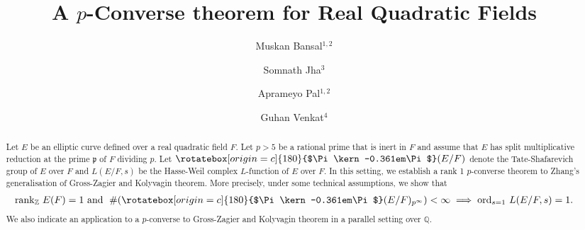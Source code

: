 \documentclass[reqno,10pt]{amsart}
\title{A $p$-Converse theorem for Real Quadratic Fields}
\newcommand{\q}{\mathbb{Q}}
\newcommand{\z}{\mathbb{Z}}
\newcommand{\p}{\mathfrak{p}}
\newcommand{\Varpi}{\rotatebox[origin=c]{180}{$\Pi\kern-0.361em\Pi$}}
\theoremstyle{plain}
\theoremstyle{definition}
\begin{document}
\author{Muskan Bansal$^{1,2}$} 
  \address{$^1$ Harish-Chandra Research Institute, Chhatnag Road, Jhunsi, Prayagraj - 211019, India}
  \address{$^2$Homi Bhabha National Institute, Training School Complex, Anushakti Nagar, Mumbai 400094, India}
\email{}


    \author{Somnath Jha$^3$} 
    \address{$^3$ Depratment of Mathematics, Indian Institute of Technology Kanpur,  Kanpur - 208016, India}
	\email{}
    
\author{Aprameyo Pal$^{1,2}$} 
   
	\email{}
    
    
    
    \author{Guhan Venkat$^4$} 
    \address{$^4$ Department of Mathematics, Ashoka University, Rajiv Gandhi Education City, Haryana - 131029,
    India.}


\begin{abstract}
    Let $E$ be an elliptic curve defined over a real quadratic field $F$. Let $p > 5$ be a rational prime that is inert in $F$ and assume that $E$ has split multiplicative reduction at the prime $\p$ of $F$ dividing $p$. Let $\Varpi(E/F)$ denote the Tate-Shafarevich group of $E$ over $F$ and $ L(E/F,s) $ be the Hasse-Weil complex $L$-function of $E$ over $F$. In this setting, we establish a rank 1 $p$-converse theorem to Zhang's generalisation of Gross-Zagier and Kolyvagin theorem. More precisely, under some technical assumptions, we show that 
    \begin{align*}
        \mathrm{rank}_\z \hspace{0.01mm} \hspace{1mm} E(F) = 1 \text{ and } \hspace{1mm} \#(\Varpi(E/F)_{p^\infty}) < \infty \implies \mathrm{ord}_{s=1} \ L(E/F,s) = 1. 
    \end{align*}
We also indicate an application to a  $p$-converse to Gross-Zagier and Kolyvagin theorem in a parallel setting over $\q$. %
\end{abstract}
\end{document}
